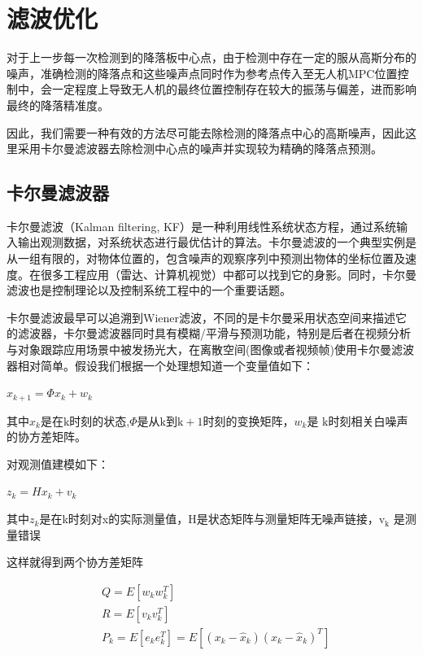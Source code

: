 \section{滤波优化}

对于上一步每一次检测到的降落板中心点，由于检测中存在一定的服从高斯分布的噪声，准确检测的降落点和这些噪声点同时作为参考点传入至无人机MPC位置控制中，会一定程度上导致无人机的最终位置控制存在较大的振荡与偏差，进而影响最终的降落精准度。

因此，我们需要一种有效的方法尽可能去除检测的降落点中心的高斯噪声，因此这里采用卡尔曼滤波器去除检测中心点的噪声并实现较为精确的降落点预测。

\subsection{卡尔曼滤波器}

卡尔曼滤波（Kalman filtering, KF）是一种利用线性系统状态方程，通过系统输入输出观测数据，对系统状态进行最优估计的算法\cite{ArtE3}。卡尔曼滤波的一个典型实例是从一组有限的，对物体位置的，包含噪声的观察序列中预测出物体的坐标位置及速度。在很多工程应用（雷达、计算机视觉）中都可以找到它的身影。同时，卡尔曼滤波也是控制理论以及控制系统工程中的一个重要话题。

卡尔曼滤波最早可以追溯到Wiener滤波，不同的是卡尔曼采用状态空间来描述它的滤波器，卡尔曼滤波器同时具有模糊/平滑与预测功能，特别是后者在视频分析与对象跟踪应用场景中被发扬光大，在离散空间(图像或者视频帧)使用卡尔曼滤波器相对简单。假设我们根据一个处理想知道一个变量值如下：

$x_{k+1}=\Phi x_{k}+w_{k}$

其中$x_{k}$是在$\mathrm{k}$时刻的状态,$\Phi$是从$\mathrm{k}$到$\mathrm{k}+1$时刻的变换矩阵，$w_{k}$是 $\mathrm{k}$时刻相关白噪声的协方差矩阵。

对观测值建模如下：

$z_{k}=H x_{k}+v_{k}$

其中$z_{k}$是在k时刻对x的实际测量值，$\mathrm{H}$是状态矩阵与测量矩阵无噪声链接，$\mathrm{v}_{\mathrm{k}}$ 是测量错误

这样就得到两个协方差矩阵

$$
\begin{aligned}
&Q=E\left[w_{k} w_{k}^{T}\right] \\
&R=E\left[v_{k} v_{k}^{T}\right] \\
&P_{k}=E\left[e_{k} e_{k}^{T}\right]=E\left[\left(x_{k}-\hat{x}_{k}\right)\left(x_{k}-\hat{x}_{k}\right)^{T}\right]
\end{aligned}
$$

